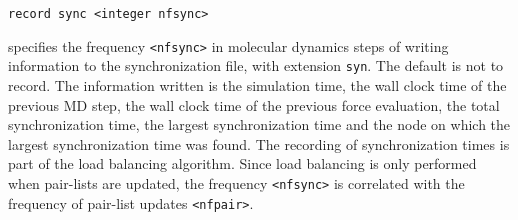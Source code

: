 \begin{description}
\item
\begin{verbatim}
record sync <integer nfsync>
\end{verbatim}
specifies the frequency  \verb+<nfsync>+ in molecular dynamics steps
of writing information to the synchronization file, with extension
\verb+syn+. 
The default is not to record.
The information written is the simulation time, the wall clock time
of the previous MD step, the wall clock time of the previous force
evaluation, the total synchronization time, the largest
synchronization time and the node on which the largest synchronization
time was found. The recording of synchronization times is part of the
load balancing algorithm. Since load balancing is only performed when
pair-lists are updated, the frequency \verb+<nfsync>+ is correlated
with the frequency of pair-list updates \verb+<nfpair>+.
\end{description}

